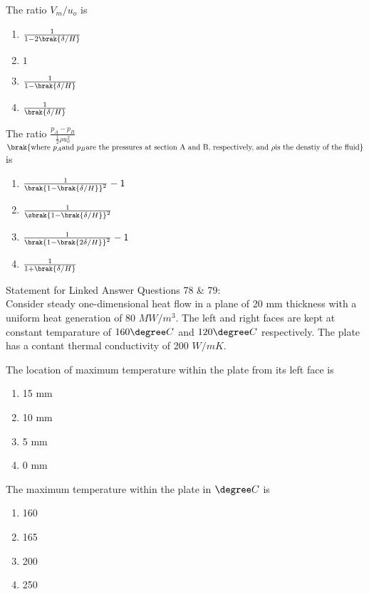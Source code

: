 	\item The ratio $V_m/u_o$ is
		\begin{enumerate}
			\item $\frac{1}{1-2\brak{\delta/H}}$
			\item $1$
			\item $\frac{1}{1-\brak{\delta/H}}$
			\item $\frac{1}{\brak{\delta/H}}$ 
		\end{enumerate}
	\item The ratio $\frac{p_A-p_B}{\frac{1}{2}\rho u_{o}^2}$ $\brak{\text{where }p_A \text{and }p_B \text{are the pressures at section A and B, respectively, and }\rho \text{is the denstiy of the fluid}}$ is
		\begin{enumerate}
			\item $\frac{1}{\brak{1-\brak{\delta/H}}^2}-1$
			\item $\frac{1}{\sbrak{1-\brak{\delta/H}}^2}$
			\item $\frac{1}{\brak{1-\brak{2\delta/H}}^2}-1$
			\item $\frac{1}{1+\brak{\delta/H}}$
		\end{enumerate}
		Statement for Linked Answer Questions 78 \& 79: \\
		Consider steady one-dimensional heat flow in a plane of 20 mm thickness with a uniform heat generation of 80 $MW/m^3$. The left and right faces are kept at constant temparature of $160\degree C$ and $120\degree C$ respectively. The plate has a contant thermal conductivity of 200 $W/mK$.
	\item The location of maximum temperature within the plate from its left face is 
		\begin{enumerate}
			\item 15 mm
			\item 10 mm
			\item 5 mm
			\item 0 mm
		\end{enumerate}
	\item The maximum temperature within the plate in $\degree C$ is 
		\begin{enumerate}
			\item 160
			\item 165
			\item 200
			\item 250
		\end{enumerate}
